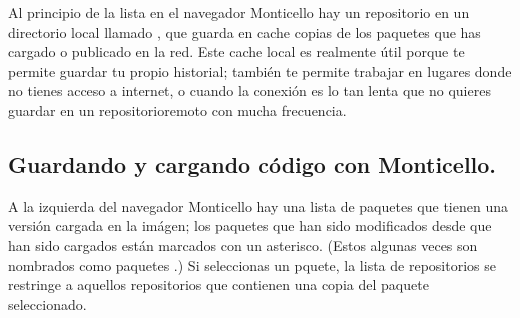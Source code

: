 \documentclass[a4paper,10pt,twoside]{book}
\begin{document}
{{%
Al principio de la lista en el navegador Monticello hay un repositorio en un directorio local llamado , que guarda en cache copias de los paquetes que has cargado o publicado en la red. Este cache local es realmente \'util porque te permite guardar tu propio historial; tambi\'en te permite trabajar en lugares donde no tienes acceso a internet, o cuando la conexi\'on es lo tan lenta que no quieres guardar en un repositorioremoto con mucha frecuencia. 

\subsection{Guardando y cargando c\'odigo con Monticello.}

A la izquierda del navegador Monticello hay una lista de paquetes que tienen una versi\'on cargada en la im\'agen; los paquetes que han sido modificados desde que han sido cargados est\'an marcados con un asterisco. (Estos algunas veces son nombrados como paquetes .) Si seleccionas un pquete, la lista de repositorios se restringe a aquellos repositorios que contienen una copia del paquete seleccionado.


}}
\end{document}
